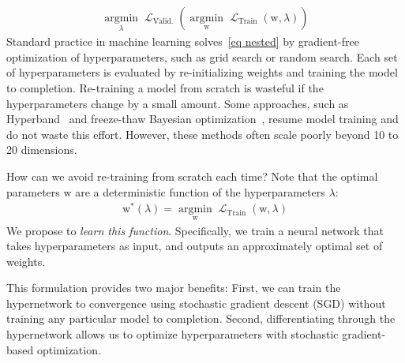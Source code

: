 \documentclass{article} %
\newcommand{\argmin}{\mathop{\mathrm{argmin}}\limits}
\newcommand{\param}{\mathrm{w}} %
\newcommand{\hyper}{\lambda} %
\newcommand{\hyperHyper}{\hyper'} %
\newcommand{\innerOptParam}[1]{\param^{*} \! \left( #1 \right)} %
\newcommand{\lossSymbol}{\mathop{\mathcal{L}}} %
\newcommand{\lossSymbolInner}{\lossSymbol_{\mathrm{Train}}} %
\newcommand{\lossSymbolOuter}{\lossSymbol_{\mathrm{Valid.}}} %
\newcommand{\innerLoss}[2]{\lossSymbolInner \! \left( #1, #2 \right)} %
\newcommand{\innerOpt}{\argmin_{\param} \innerLoss{\param}{\hyper}} %
\newcommand{\outerLoss}[1]{\lossSymbolOuter \! \left( #1 \right)}%
\newcommand{\outerOpt}[1]{\argmin_{\hyper} \outerLoss{#1}} %
\begin{document}
%
\begin{align}
\outerOpt{\innerOpt}
\label{eq nested}
\end{align}
%
Standard practice in machine learning solves~\eqref{eq nested} by gradient-free optimization of hyperparameters, such as grid search or random search.
Each set of hyperparameters is evaluated by re-initializing weights and training the model to completion.
Re-training a model from scratch is wasteful if the hyperparameters change by a small amount.
Some approaches, such as Hyperband~\citep{li2016hyperband} and freeze-thaw Bayesian optimization~\citep{swersky2014freeze}, resume model training and do not waste this effort.
However, these methods often scale poorly beyond 10 to 20 dimensions.

How can we avoid re-training from scratch each time?
Note that the optimal parameters $\param$ are a deterministic function of the hyperparameters $\hyper$:
%
\begin{align}
\innerOptParam{\hyper} = \innerOpt
\label{best response equation}
\end{align}
%
We propose to \emph{learn this function}.
Specifically, we train a neural network that takes hyperparameters as input, and outputs an approximately optimal set of weights.

This formulation provides two major benefits:
First, we can train the hypernetwork to convergence using stochastic gradient descent (SGD) without training any particular model to completion.
Second, differentiating through the hypernetwork allows us to optimize hyperparameters with stochastic gradient-based optimization.
%
\end{document}
